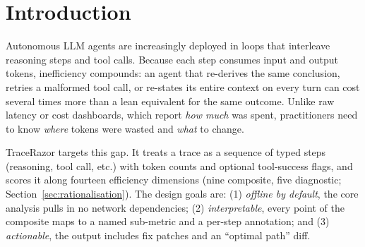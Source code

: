 \documentclass[11pt]{article}
\begin{document}
\section{Introduction}
Autonomous LLM agents are increasingly deployed in loops that interleave
reasoning steps and tool calls. Because each step consumes input and output
tokens, inefficiency compounds: an agent that re-derives the same conclusion,
retries a malformed tool call, or re-states its entire context on every turn can
cost several times more than a lean equivalent for the same outcome. Unlike raw
latency or cost dashboards, which report \emph{how much} was spent, practitioners
need to know \emph{where} tokens were wasted and \emph{what} to change.

TraceRazor targets this gap. It treats a trace as a sequence of typed steps
(reasoning, tool call, etc.) with token counts and optional tool-success flags,
and scores it along fourteen efficiency dimensions (nine composite, five
diagnostic; Section~\ref{sec:rationalisation}). The design goals are: (1)
\emph{offline by default}, the core analysis pulls in no network
dependencies; (2) \emph{interpretable}, every point of the composite maps to
a named sub-metric and a per-step annotation; and (3) \emph{actionable}, the
output includes fix patches and an ``optimal path'' diff.
\end{document}
